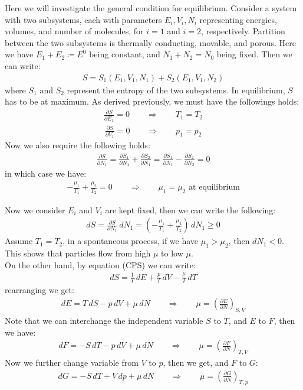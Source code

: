 \documentclass[11pt,oneside]{book}
\theoremstyle{break}
\theoremstyle{break}
\newcommand{\pd}{\partial}
\newcommand{\lr}[1]{\left( #1 \right)}
\begin{document}
Here we will investigate the general condition for equilibrium. Consider a system with two subsystems, each with parameters $E_i, V_i, N_i$ representing energies, volumes, and number of molecules, for $i=1$ and $i=2$, respectively. Partition between the two subsystems is thermally conducting, movable, and porous. Here we have $E_1 + E_2 \coloneqq E^0$ being constant, and $N_1 + N_2 = N_0$ being fixed. Then we can write:
\begin{align*}
S= S_1 (E_1,V_1,N_1) + S_2(E_1,V_1,N_2)
\end{align*}
where $S_1$ and $S_2$ represent the entropy of the two subsystems. In equilibrium, $S$ has to be at maximum. As derived previously, we must have the followings holds:
\begin{align*}
\frac{\pd S}{\pd E_1} = 0 \qquad \Rightarrow \qquad T_1 = T_2
\end{align*}
\begin{align*}
\frac{\pd S}{\pd V_1}= 0 \qquad \Rightarrow \qquad p_1 = p_2
\end{align*}
Now we also require the following holds:
\begin{align*}
\frac{\pd S}{\pd N_1} = \frac{\pd S_1}{\pd N_1} + \frac{\pd S_2}{\pd N_1} = \frac{\pd S_1}{\pd N_1} - \frac{\pd S_2}{\pd N_2} = 0
\end{align*}
in which case we have:
\begin{align*}
-\frac{\mu_1}{T_1} + \frac{\mu_2}{T_2} = 0 \qquad \Rightarrow \qquad \mu_1 = \mu_2 \text{ at equilibrium}
\end{align*}

Now we consider $E_i$ and $V_i$ are kept fixed, then we can write the following:
\begin{align*}
dS = \frac{\pd S}{\pd N_1}\,dN_1 = \left( - \frac{\mu_1}{T_1}+ \frac{\mu_2}{T_2}\right) \, dN_1 \geq 0
\end{align*}
Assume $T_1 = T_2$, in a spontaneous process, if we have $\mu_1 > \mu_2$, then $dN_1 < 0$. \\
This shows that particles flow from high $\mu$ to low $\mu$.\\

On the other hand, by equation (CPS) we can write:
\begin{align*}
dS = \frac{1}{T}\, dE + \frac{p}{T}\, dV - \frac{\mu}{T}\, dT
\end{align*}
rearranging we get:
\begin{align*}
dE = T\, dS - p\, dV + \mu\, dN \qquad \Rightarrow \qquad 
\mu = \lr{\frac{\pd E}{\pd N}}_{S,V} 
\end{align*}
Note that we can interchange the independent variable $S$ to $T$, and $E$ to $F$, then we have:
\begin{align*}
dF = -S\, dT - p\, dV + \mu\, dN \qquad \Rightarrow \qquad \mu = \lr{\frac{\pd F}{\pd N}}_{T,V}
\end{align*}
Now we further change variable from $V$ to $p$, then we get, and $F$ to $G$:
\begin{align*}
dG = -S\, dT + V\, dp + \mu\, dN \qquad \Rightarrow \qquad \mu = \lr{\frac{\pd G}{\pd N}}_{T,p}
\end{align*}
\end{document}
